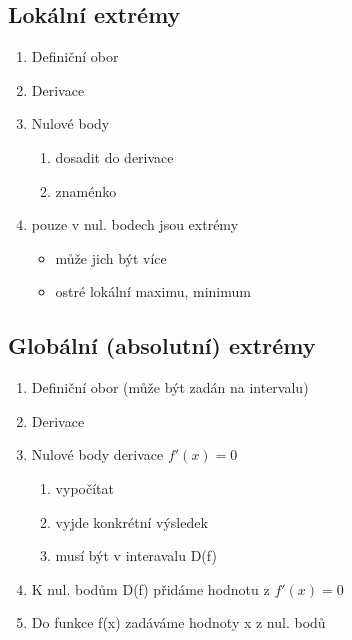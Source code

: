 \documentclass{article}
\begin{document}
\subsection{Lokální extrémy}
\begin{enumerate}
  \item Definiční obor
  \item Derivace
  \item Nulové body
    \begin{enumerate}[label=(\alph*)]
      \item dosadit do derivace
      \item znaménko
    \end{enumerate}
  \item pouze v nul. bodech jsou extrémy
    \begin{itemize}
      \item může jich být více
      \item ostré lokální maximu, minimum
    \end{itemize}
\end{enumerate}

\subsection{Globální (absolutní) extrémy}
\begin{enumerate}
  \item Definiční obor (může být zadán na intervalu)
  \item Derivace
  \item Nulové body derivace $f'(x)=0$
    \begin{enumerate}[label=(\alph*)]
      \item vypočítat
      \item vyjde konkrétní výsledek
      \item musí být v interavalu D(f)
    \end{enumerate}
  \item K nul. bodům D(f) přidáme hodnotu z $f'(x)=0$
  \item Do funkce f(x) zadáváme hodnoty x z nul. bodů
\end{enumerate}
\end{document}
